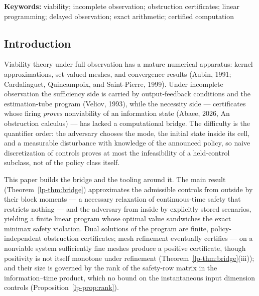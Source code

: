 \documentclass[10pt,twocolumn]{article}
\theoremstyle{plain}
\theoremstyle{definition}
\theoremstyle{remark}
\begin{document}
\begin{abstract}
standard solver (HiGHS) across a five-point mesh refinement; optimality is
certified in exact rational arithmetic by independent primal and dual
witnesses, the solver agreeing with the exact values to at most
\(4.2 \times 10^{-17}\), and the refinement obeys the closed law
\(\rho(h) = 3/50 - Th/4\) (an unrestricted level, nonnegative on this
family for \(h \le \tfrac15\)). A finite-side reference library,
\texttt{viacert}, packages the exact finite-horizon recursion and the
fibre-partition criteria behind a pluggable finite-system interface, with
twelve audited identities in its self-test; the bridge's continuous
programs live in the campaign scripts, not in the library. All exact verification paths for the reported rational benchmark run in
integer and rational arithmetic; solver outputs are numerical
confirmations, never proof objects.
\end{abstract}

\textbf{Keywords:} viability; incomplete observation; obstruction
certificates; linear programming; delayed observation; exact
arithmetic; certified computation

\subsection{Introduction}\label{lp-introduction}

Viability theory under full observation has a mature numerical apparatus:
kernel approximations, set-valued meshes, and convergence results
(Aubin, 1991; Cardaliaguet, Quincampoix, and Saint-Pierre, 1999). Under
incomplete observation the sufficiency side is carried by output-feedback
conditions and the estimation-tube program (Veliov, 1993), while the
necessity side --- certificates whose firing \emph{proves} nonviability of an
information state (Abaee, 2026, An obstruction calculus) --- has lacked a computational bridge. The
difficulty is the quantifier order: the adversary chooses the mode, the
initial state inside its cell, and a measurable disturbance with knowledge of
the announced policy, so naive discretization of controls proves at most the
infeasibility of a held-control subclass, not of the policy class itself.

This paper builds the bridge and the tooling around it. The main result
(Theorem~\ref{lp-thm:bridge}) approximates the admissible controls from outside
by their block moments --- a necessary relaxation of continuous-time safety
that restricts nothing --- and the adversary from inside by explicitly stored
scenarios, yielding a finite linear program whose optimal value sandwiches
the exact minimax safety violation. Dual solutions of the program are finite,
policy-independent obstruction certificates; mesh refinement eventually
certifies --- on a nonviable system sufficiently fine meshes produce a
positive certificate, though positivity is not itself monotone under
refinement (Theorem~\ref{lp-thm:bridge}(iii)); and their size is governed by
the rank of the
safety-row matrix in the information--time product, which no bound on the
instantaneous input dimension controls (Proposition~\ref{lp-prop:rank}).
\end{document}
